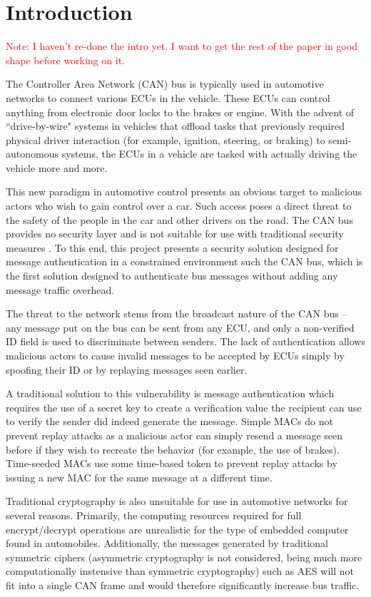 \section{Introduction}
\textcolor{red}{Note: I haven't re-done the intro yet. I want to get the rest of the paper in good shape before working on it.}

The Controller Area Network (CAN) bus is typically used in automotive networks to connect various ECUs in the vehicle. These ECUs can control anything from electronic door locks to the brakes or engine. With the advent of ``drive-by-wire" systems in vehicles that offload tasks that previously required physical driver interaction (for example, ignition, steering, or braking) to semi-autonomous systems, the ECUs in a vehicle are tasked with actually driving the vehicle more and more.

This new paradigm in automotive control presents an obvious target to malicious actors who wish to gain control over a car. Such access poses a direct threat to the safety of the people in the car and other drivers on the road. The CAN bus provides no security layer and is not suitable for use with traditional security measures \cite{Koscher-2010}\cite{Checkoway-2011}. To this end, this project presents a security solution designed for message authentication in a constrained environment such the CAN bus, which is the first solution designed to authenticate bus messages without adding any message traffic overhead. 

The threat to the network stems from the broadcast nature of the CAN bus -- any message put on the bus can be sent from any ECU, and only a non-verified ID field is used to discriminate between senders. The lack of authentication allows malicious actors to cause invalid messages to be accepted by ECUs simply by spoofing their ID or by replaying messages seen earlier.

A traditional solution to this vulnerability is message authentication which requires the use of a secret key to create a verification value the recipient can use to verify the sender did indeed generate the message. Simple MACs do not prevent replay attacks as a malicious actor can simply resend a message seen before if they wish to recreate the behavior (for example, the use of brakes). Time-seeded MACs use some time-based token to prevent replay attacks by issuing a new MAC for the same message at a different time.

Traditional cryptography is also unsuitable for use in automotive networks for several reasons. Primarily, the computing resources required for full encrypt/decrypt operations are unrealistic for the type of embedded computer found in automobiles. Additionally, the messages generated by traditional symmetric ciphers (asymmetric cryptography is not considered, being much more computationally instensive than symmetric cryptography) such as AES will not fit into a single CAN frame and would therefore significantly increase bus traffic.

